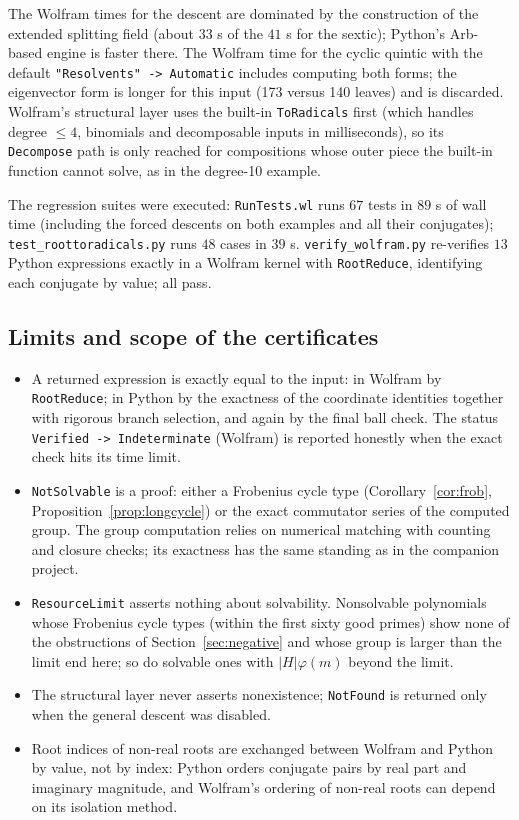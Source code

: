 \documentclass[11pt,a4paper]{article}
\theoremstyle{definition}
\theoremstyle{remark}
\newcommand{\code}[1]{\texttt{#1}}
\begin{document}
The Wolfram times for the descent are dominated by the construction of the extended
splitting field (about $33$ s of the $41$ s for the sextic); Python's Arb-based engine is
faster there.  The Wolfram time for the cyclic quintic with the default
\code{"Resolvents" -> Automatic} includes computing both forms; the eigenvector form is
longer for this input (173 versus 140 leaves) and is discarded.  Wolfram's structural
layer uses the built-in \code{ToRadicals} first (which handles degree $\le4$, binomials
and decomposable inputs in milliseconds), so its \code{Decompose} path is only reached
for compositions whose outer piece the built-in function cannot solve, as in the
degree-10 example.

The regression suites were executed: \code{RunTests.wl} runs $67$ tests in $89$ s of
wall time (including the forced descents on both examples and all their conjugates);
\code{test\_roottoradicals.py} runs $48$ cases in $39$ s.  \code{verify\_wolfram.py}
re-verifies $13$ Python expressions exactly in a Wolfram kernel with \code{RootReduce},
identifying each conjugate by value; all pass.

\subsection{Limits and scope of the certificates}

\begin{itemize}[nosep]
\item A returned expression is exactly equal to the input: in Wolfram by
\code{RootReduce}; in Python by the exactness of the coordinate identities together with
rigorous branch selection, and again by the final ball check.  The status
\code{Verified -> Indeterminate} (Wolfram) is reported honestly when the exact check hits
its time limit.
\item \code{NotSolvable} is a proof: either a Frobenius cycle type
(Corollary~\ref{cor:frob}, Proposition~\ref{prop:longcycle}) or the exact commutator
series of the computed group.  The group computation relies on numerical matching with
counting and closure checks; its exactness has the same standing as in the companion
project.
\item \code{ResourceLimit} asserts nothing about solvability.  Nonsolvable polynomials
whose Frobenius cycle types (within the first sixty good primes) show none of the
obstructions of Section~\ref{sec:negative} and whose group is larger than the limit end
here; so do solvable ones with $|H|\varphi(m)$ beyond the limit.
\item The structural layer never asserts nonexistence; \code{NotFound} is returned only
when the general descent was disabled.
\item Root indices of non-real roots are exchanged between Wolfram and Python by
value, not by index: Python orders conjugate pairs by real part and imaginary
magnitude, and Wolfram's ordering of non-real roots can depend on its isolation method.
\end{itemize}
\end{document}
